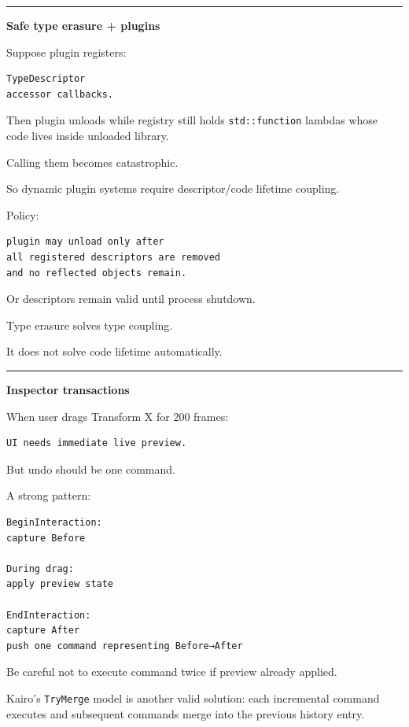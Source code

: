 \begin{center}\rule{0.5\linewidth}{0.5pt}\end{center}

\textbf{Safe type erasure + plugins}

Suppose plugin registers:

\begin{verbatim}
TypeDescriptor
accessor callbacks.
\end{verbatim}

Then plugin unloads while registry still holds \texttt{std::function} lambdas whose code lives inside unloaded library.

Calling them becomes catastrophic.

So dynamic plugin systems require descriptor/code lifetime coupling.

Policy:

\begin{verbatim}
plugin may unload only after
all registered descriptors are removed
and no reflected objects remain.
\end{verbatim}

Or descriptors remain valid until process shutdown.

Type erasure solves type coupling.

It does not solve code lifetime automatically.

\begin{center}\rule{0.5\linewidth}{0.5pt}\end{center}

\textbf{Inspector transactions}

When user drags Transform X for 200 frames:

\begin{verbatim}
UI needs immediate live preview.
\end{verbatim}

But undo should be one command.

A strong pattern:

\begin{verbatim}
BeginInteraction:
capture Before

During drag:
apply preview state

EndInteraction:
capture After
push one command representing Before→After
\end{verbatim}

Be careful not to execute command twice if preview already applied.

Kairo's \texttt{TryMerge} model is another valid solution: each incremental command executes and subsequent commands merge into the previous history entry.

